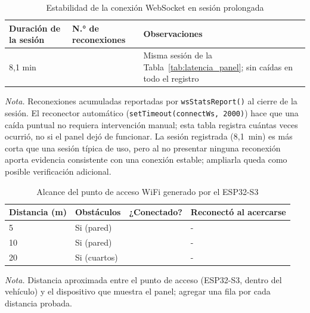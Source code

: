 \begin{table}[H]
	\centering
	\captionsetup{labelformat=simple, labelsep=newline, textfont=it, labelfont=bf, justification=raggedright, singlelinecheck=false}
	\caption{Estabilidad de la conexión WebSocket en sesión prolongada}
	\label{tab:estabilidad_ws}
	\begin{tabularx}{\textwidth}{X >{\centering\arraybackslash}p{3cm} >{\centering\arraybackslash}p{3.5cm}}
		\toprule
		\rowcolor[rgb]{0.851, 0.851, 0.851}
		Duración de la sesión & N.° de reconexiones & Observaciones \\
		\midrule
		8,1 min & 0 & Misma sesión de la Tabla~\ref{tab:latencia_panel}; sin caídas en todo el registro \\
		\bottomrule
	\end{tabularx}
	\vskip 0.15cm
	{\footnotesize \textit{Nota.} Reconexiones acumuladas reportadas por \texttt{wsStatsReport()} al cierre de la sesión. El reconector automático (\texttt{setTimeout(connectWs, 2000)}) hace que una caída puntual no requiera intervención manual; esta tabla registra cuántas veces ocurrió, no si el panel dejó de funcionar. La sesión registrada (8,1~min) es más corta que una sesión típica de uso, pero al no presentar ninguna reconexión aporta evidencia consistente con una conexión estable; ampliarla queda como posible verificación adicional.}
\end{table}

\begin{table}[H]
	\centering
	\captionsetup{labelformat=simple, labelsep=newline, textfont=it, labelfont=bf, justification=raggedright, singlelinecheck=false}
	\caption{Alcance del punto de acceso WiFi generado por el ESP32-S3}
	\label{tab:alcance_wifi}
	\begin{tabularx}{\textwidth}{>{\centering\arraybackslash}p{2.5cm} >{\centering\arraybackslash}p{3.5cm} >{\centering\arraybackslash}p{2.5cm} X}
		\toprule
		\rowcolor[rgb]{0.851, 0.851, 0.851}
		Distancia (m) & Obstáculos & ¿Conectado? & Reconectó al acercarse \\
		\midrule
		{}5 & Si (pared) & \checkmark & - \\
		{}10 & Si (pared) & \checkmark & - \\
		{}20 & Si (cuartos) & \checkmark & - \\
		\bottomrule
	\end{tabularx}
	\vskip 0.15cm
	{\footnotesize \textit{Nota.} Distancia aproximada entre el punto de acceso (ESP32-S3, dentro del vehículo) y el dispositivo que muestra el panel; agregar una fila por cada distancia probada.}
\end{table}

